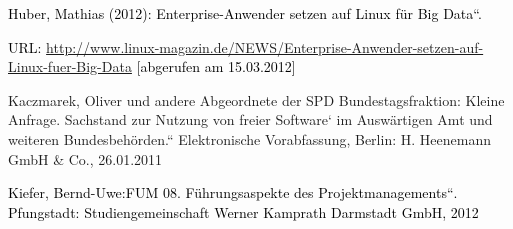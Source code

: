 \documentclass[a4paper]{article}
\newcommand\textstyleInternetlink[1]{\foreignlanguage{english}{\textcolor[rgb]{0.0,0.0,0.5019608}{#1}}}
\begin{document}
\bigskip

{
\textstyleInternetlink{\textcolor{black}{Huber, Mathias (2012):
{\quotedblbase}}}\textstyleInternetlink{\textcolor{black}{Enterprise-Anwender}}\textstyleInternetlink{\textcolor{black}{
}}\textstyleInternetlink{\textcolor{black}{setzen}}\textstyleInternetlink{\textcolor{black}{
}}\textstyleInternetlink{\textcolor{black}{auf}}\textstyleInternetlink{\textcolor{black}{
}}\textstyleInternetlink{\textcolor{black}{Linux}}\textstyleInternetlink{\textcolor{black}{
}}\textstyleInternetlink{\textcolor{black}{f\"ur}}\textstyleInternetlink{\textcolor{black}{
}}\textstyleInternetlink{\textcolor{black}{Big}}\textstyleInternetlink{\textcolor{black}{
}}\textstyleInternetlink{\textcolor{black}{Data}}\textstyleInternetlink{\textcolor{black}{{\textquotedblleft}.}}\textstyleInternetlink{\textcolor{black}{
}}}

{
\textstyleInternetlink{\textcolor{black}{URL:
}}\url{http://www.linux-magazin.de/NEWS/Enterprise-Anwender-setzen-auf-Linux-fuer-Big-Data}\textstyleInternetlink{\textcolor{black}{
}}\textstyleInternetlink{\textcolor{black}{[abgerufen am 15.03.2012]}}}


\bigskip

{
Kaczmarek, Oliver und andere Abgeordnete der SPD Bundestagsfraktion:
{\quotedblbase}Kleine Anfrage. Sachstand zur Nutzung von
{\quotesinglbase}freier Software{\textquoteleft} im Ausw\"artigen Amt
und weiteren Bundesbeh\"orden.{\textquotedblleft} Elektronische
Vorabfassung, Berlin: H. Heenemann GmbH \& Co., 26.01.2011}


\bigskip

{
\textcolor{black}{Kiefer,
Bernd}\textcolor{black}{{}-Uwe:}\textcolor{black}{
{\quotedblbase}}\textcolor{black}{FUM}\textcolor{black}{
}\textcolor{black}{08}\textcolor{black}{.
}\textstyleInternetlink{\textcolor{black}{F\"uhrungsaspekte}}\textstyleInternetlink{\textcolor{black}{
}}\textstyleInternetlink{\textcolor{black}{des}}\textstyleInternetlink{\textcolor{black}{
}}\textstyleInternetlink{\textcolor{black}{Projektmanagements}}\textstyleInternetlink{\textcolor{black}{{\textquotedblleft}}}\textstyleInternetlink{\foreignlanguage{ngerman}{\textcolor{black}{.}}}\textstyleInternetlink{\foreignlanguage{ngerman}{\textcolor{black}{
}}}\textstyleInternetlink{\foreignlanguage{ngerman}{\textcolor{black}{Pfungstadt:}}}\textstyleInternetlink{\foreignlanguage{ngerman}{\textcolor{black}{
}}}\textcolor{black}{Studiengemeinschaft}\textcolor{black}{
}\textcolor{black}{Werner}\textcolor{black}{
}\textcolor{black}{Kamprath}\textcolor{black}{
}\textcolor{black}{Darmstadt}\textcolor{black}{
}\textcolor{black}{GmbH}\textcolor{black}{, 2012}}
\end{document}

